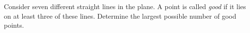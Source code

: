 Consider seven different straight lines in the plane.
A point is called \emph{good} if it lies on at least three of these lines.
Determine the largest possible number of good points.
